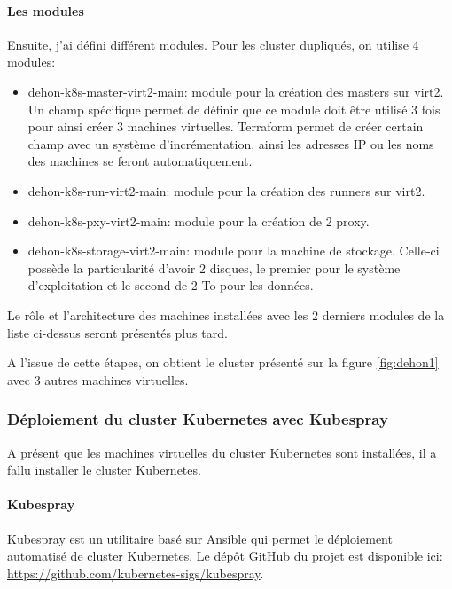 \documentclass[12pt]{article}
\begin{document}
\paragraph{Les modules}
Ensuite, j'ai défini différent modules. Pour les cluster dupliqués, on utilise 4 modules:
\begin{itemize}
    \item dehon-k8s-master-virt2-main: module pour la création des masters sur virt2.
    Un champ spécifique permet de définir que ce module doit être utilisé 3 fois pour ainsi créer 3 machines virtuelles.
    Terraform permet de créer certain champ avec un système d'incrémentation, ainsi les adresses IP ou les noms des machines se feront automatiquement.
    \item dehon-k8s-run-virt2-main: module pour la création des runners sur virt2.
    \item dehon-k8s-pxy-virt2-main: module pour la création de 2 proxy.
    \item dehon-k8s-storage-virt2-main: module pour la machine de stockage.
    Celle-ci possède la particularité d'avoir 2 disques, le premier pour le système d'exploitation et le second de 2 To pour les données.
\end{itemize}

Le rôle et l'architecture des machines installées avec les 2 derniers modules de la liste ci-dessus seront présentés plus tard.

A l'issue de cette étapes, on obtient le cluster présenté sur la figure \ref{fig:dehon1} avec 3 autres machines virtuelles.

\subsubsection{Déploiement du cluster Kubernetes avec Kubespray}
A présent que les machines virtuelles du cluster Kubernetes sont installées, il a fallu installer le cluster Kubernetes.

\paragraph{Kubespray}
Kubespray est un utilitaire basé sur Ansible qui permet le déploiement automatisé de cluster Kubernetes.
Le dépôt GitHub du projet est disponible ici: \\ \url{https://github.com/kubernetes-sigs/kubespray}.
\end{document}
